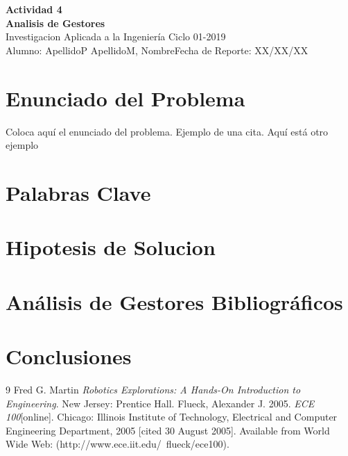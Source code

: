 \documentclass[a4paper, 11pt]{article}
\begin{document}
\noindent
\large\textbf{Actividad 4} \\
\textbf{Analisis de Gestores} \\
\normalsize Investigacion Aplicada a la Ingeniería Ciclo 01-2019 \\
Alumno: ApellidoP ApellidoM, Nombre\hfill Fecha de Reporte: XX/XX/XX \\
 

\section*{Enunciado del Problema}
Coloca aquí el enunciado del problema. Ejemplo de una cita\cite[p.219]{Robotics}. Aquí está otro ejemplo\cite{Flueck}

\section*{Palabras Clave}
\lipsum[2]

\section*{Hipotesis de Solucion}
\lipsum[3]

\section*{Análisis de Gestores Bibliográficos}
\lipsum[4]

\section*{Conclusiones}
\lipsum[5]



\begin{thebibliography}{9}
 Fred G. Martin \emph{Robotics Explorations: A Hands-On Introduction to Engineering}. New Jersey: Prentice Hall.
  Flueck, Alexander J. 2005. \emph{ECE 100}[online]. Chicago: Illinois Institute of Technology, Electrical and Computer Engineering Department, 2005 [cited 30
August 2005]. Available from World Wide Web: (http://www.ece.iit.edu/~flueck/ece100).
\end{thebibliography}
\end{document}
